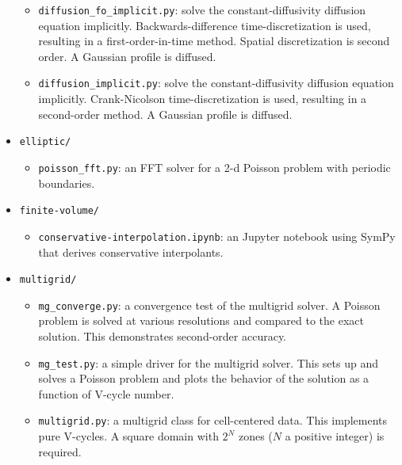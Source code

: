 \begin{itemize}
\begin{itemize}
    \item {\tt diffusion\_fo\_implicit.py}: solve the
      constant-diffusivity diffusion equation implicitly.
      Backwards-difference time-discretization is used, resulting in a
      first-order-in-time method.  Spatial discretization is second
      order.  A Gaussian profile is diffused.

    \item {\tt diffusion\_implicit.py}: solve the constant-diffusivity
      diffusion equation implicitly.  Crank-Nicolson time-discretization
      is used, resulting in a second-order method.  A Gaussian profile
      is diffused.

  \end{itemize}
  
\item {\tt elliptic/}

  \begin{itemize}
    \item {\tt poisson\_fft.py}: an FFT solver for a 2-d Poisson problem
    with periodic boundaries.
  \end{itemize}

\item {\tt finite-volume/}

  \begin{itemize}
  \item {\tt conservative-interpolation.ipynb}: an {\sf Jupyter} notebook
    using {\sf SymPy} that derives conservative interpolants.
  \end{itemize}

\item {\tt multigrid/}

  \begin{itemize}
  \item {\tt mg\_converge.py}: a convergence test of the multigrid
    solver.  A Poisson problem is solved at various resolutions and
    compared to the exact solution.  This demonstrates second-order
    accuracy.

  \item {\tt mg\_test.py}: a simple driver for the multigrid solver.
    This sets up and solves a Poisson problem and plots the behavior 
    of the solution as a function of V-cycle number.

  \item{\tt multigrid.py}: a multigrid class for cell-centered data.
    This implements pure V-cycles.  A square domain with $2^N$ zones
    ($N$ a positive integer) is required.


\end{itemize}
\end{itemize}
